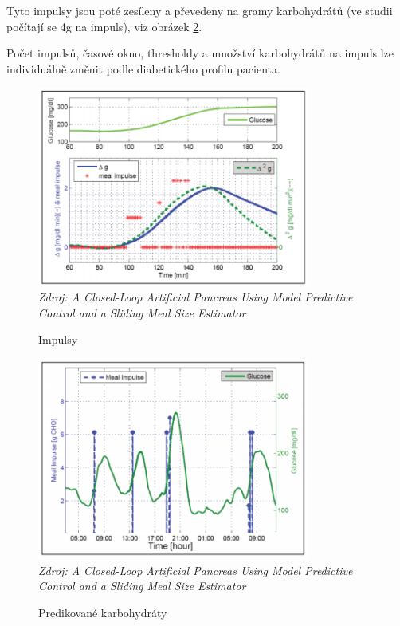 Tyto impulsy jsou poté zesíleny a převedeny na gramy karbohydrátů (ve studii počítají se 4g na impuls), viz obrázek \ref{fig:threshold2}.

Počet impulsů, časové okno, thresholdy a množství karbohydrátů na impuls lze individuálně změnit podle diabetického profilu pacienta.

\begin{figure}[H]
\caption{Impulsy}
\label{fig:threshold1}
\centering
\includegraphics[width=0.8\textwidth]{img/analyza/threshold1.png}\\
\textit{Zdroj: A Closed-Loop Artificial Pancreas Using Model Predictive Control and a Sliding Meal Size Estimator \citep{Analyza.Thresholds}}
\end{figure}
\begin{figure}[H]
\caption{Predikované karbohydráty}
\label{fig:threshold2}
\centering
\includegraphics[width=0.8\textwidth]{img/analyza/threshold2.png}\\
\textit{Zdroj: A Closed-Loop Artificial Pancreas Using Model Predictive Control and a Sliding Meal Size Estimator \citep{Analyza.Thresholds}}
\end{figure}

